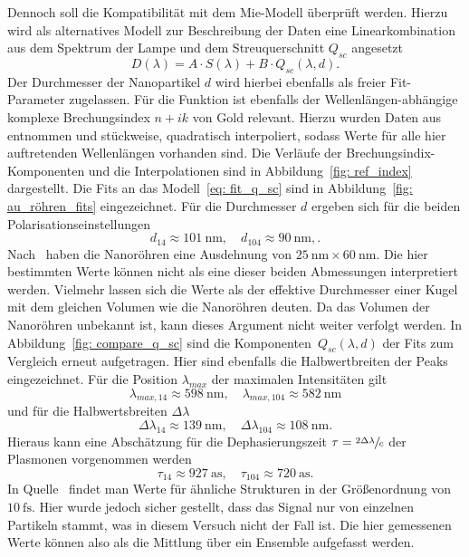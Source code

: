 Dennoch soll die Kompatibilität mit dem Mie-Modell überprüft werden. Hierzu wird als alternatives Modell zur Beschreibung der
Daten eine Linearkombination aus dem Spektrum der Lampe und dem Streuquerschnitt $Q_{sc}$ angesetzt
\begin{equation}
  D(\lambda) = A \cdot S(\lambda) + B \cdot Q_{sc}(\lambda, d).
  \label{eq: fit_q_sc}
\end{equation}
Der Durchmesser der Nanopartikel $d$ wird hierbei ebenfalls als freier Fit-Parameter zugelassen.
Für die Funktion ist ebenfalls der Wellenlängen-abhängige komplexe Brechungsindex $n + ik$ von Gold relevant. Hierzu wurden
Daten aus~\cite{ref_index_au} entnommen und stückweise, quadratisch interpoliert, sodass Werte für alle hier auftretenden Wellenlängen
vorhanden sind. Die Verläufe der Brechungsindix-Komponenten und die Interpolationen sind in Abbildung~\ref{fig: ref_index}
dargestellt. Die Fits an das Modell~\eqref{eq: fit_q_sc} sind in Abbildung~\ref{fig: au_röhren_fits} eingezeichnet.
Für die Durchmesser $d$ ergeben sich für die beiden Polarisationseinstellungen
\begin{equation}
  d_{14} \approx \SI{101}{\nano\meter}, \quad d_{104} \approx \SI{90}{\nano\meter}, .
\end{equation}
Nach~\cite{anleitung} haben die Nanoröhren eine Ausdehnung von $\SI{25}{\nano\meter} \times \SI{60}{\nano\meter}$. Die hier bestimmten Werte
können nicht als eine dieser beiden Abmessungen interpretiert werden. Vielmehr lassen sich die Werte als
der effektive Durchmesser einer Kugel mit dem gleichen Volumen wie die Nanoröhren deuten. Da das Volumen der Nanoröhren
unbekannt ist, kann dieses Argument nicht weiter verfolgt werden.
In Abbildung~\ref{fig: compare_q_sc} sind die Komponenten~$Q_{sc}(\lambda, d)$ der Fits zum Vergleich erneut aufgetragen. Hier sind ebenfalls
die Halbwertbreiten der Peaks eingezeichnet. Für die Position $\lambda_{max}$ der maximalen Intensitäten gilt
\begin{equation}
  \lambda_{max, 14} \approx \SI{598}{\nano\meter}, \quad \lambda_{max, 104} \approx \SI{582}{\nano\meter}
\end{equation}
und für die Halbwertsbreiten $\Delta \lambda$
\begin{equation}
  \Delta \lambda_{14} \approx \SI{139}{\nano\meter}, \quad \Delta \lambda_{104} \approx \SI{108}{\nano\meter}.
\end{equation}
Hieraus kann eine Abschätzung für die Dephasierungszeit $\tau = \sfrac{2 \Delta \lambda}{c}$ \cite{t_deph} der Plasmonen vorgenommen werden
\begin{equation}
  \tau_{14} \approx \SI{927}{\atto \second}, \quad   \tau_{104} \approx \SI{720}{\atto\second}.
\end{equation}
In Quelle~\cite{t_deph} findet man Werte für ähnliche Strukturen in der Größenordnung von $\SI{10}{\femto\second}$.
Hier wurde jedoch sicher gestellt, dass das Signal nur von einzelnen Partikeln stammt, was in diesem Versuch
nicht der Fall ist. Die hier gemessenen Werte können also als die Mittlung über ein Ensemble aufgefasst werden.

